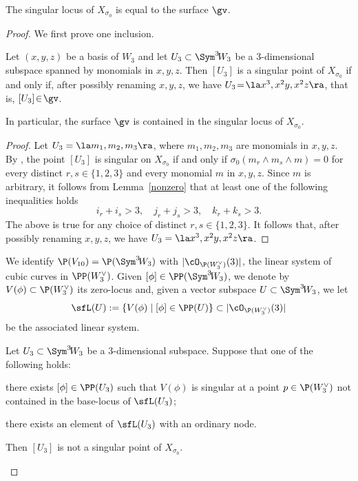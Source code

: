 \begin{prop}\label{singeffe}
The singular locus of $X_{\sigma_0}$ is equal to the surface $\gv$.
\end{prop}

\begin{proof}
We first prove one inclusion.

\begin{lemm}\label{monsing}
Let $(x,y,z)$ be a basis of $W_{3}$ and let $U_3\subset \Sym^3 \!W_3$ be a $3$-dimensional subspace spanned by monomials in $x,y,z$. Then $[U_3]$ is a singular point of $X_{\sigma_0}$ if and only if, after possibly renaming $x, y, z$, we have $U_3\!=\!\la x^3,x^2y,x^2z\ra$, that is, \hbox{$[ U_3]\!\in\!\gv$}.

In particular, the surface $\gv$ is contained in the singular locus of $X_{\sigma_0}$.
\end{lemm}

\begin{proof}
Let $U_3=\la m_1,m_2,m_3\ra$, where $m_1,m_2,m_3$ are monomials in $x,y,z$. By \cite[Prop.\,3.1]{devo}, the point $[U_3]$
is singular on $X_{\sigma_0}$ if and only if ${\sigma_0}(m_r\wedge m_s\wedge m)=0$ for every distinct $r,s\in\{1,2,3\}$ and every monomial $m$ in $x,y,z$. Since $m$ is arbitrary, it follows from Lemma~\ref{nonzero} that at least one of the
following inequalities holds
\[
i_r+i_s>3,\quad j_r+j_s>3,\quad k_r+k_s>3.
\]
The above is true for any choice of distinct $r,s\in\{1,2,3\}$. It follows that, after possibly renaming $x,y,z$, we have $U_3=\la x^3,x^2y,x^2z\ra$.
\end{proof}

We identify $\P(V_{10})=\P(\Sym^3\! W_3)$ with $|\cO_{\P(W_3^{\vee})}(3)|$, the linear system of cubic curves in $\PP(W^{\vee}_3)$. Given $[\phi]\in \PP(\Sym^3\! W_3)$, we denote by $V(\phi)\subset \P(W_3^{\vee})$ its zero-locus
and, given
a vector subspace $U\subset \Sym^3 \!W_3$, we let
\begin{equation}\label{sistlin}
\sfL(U):=\{V(\phi) \mid [\phi]\in\PP(U)\}\subset |\cO_{\P(W_3^{\vee})}(3)|
\end{equation}
be the associated linear system.

\begin{lemm}\label{primopasso}
Let $U_3\subset \Sym^3 \!W_3$ be a $3$-dimensional subspace. Suppose that one of the following holds:
\begin{enumeratea}
\item\label{primopassoa}
there exists $[\phi]\in \PP(U_3)$ such that $V(\phi)$ is singular at a point $p\in \P(W_3^{\vee})$ not contained in the base-locus of $\sfL(U_3)$;
\item\label{primopassob}
there exists an element of $\sfL(U_3)$ with an ordinary node.
\end{enumeratea}
\noindent
Then $[U_3]$ is not a singular point of $X_{\sigma_0}$.
\end{lemm}


\end{proof}
